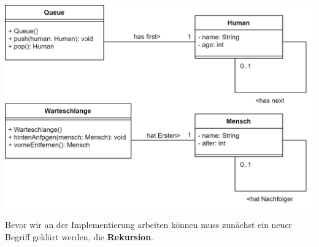 \documentclass{article}
\begin{document}
\begin{center}
    \includegraphics[scale=0.2]{../media/linkedlist_diagram.png}
\end{center}
Bevor wir an der Implementierung arbeiten können muss zunächst ein neuer Begriff geklärt werden, die 
\textbf{\color{red} Rekursion}.
\newpage
\end{document}
